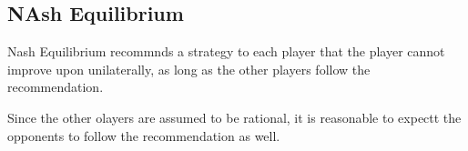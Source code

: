 
\subsection{NAsh Equilibrium}

Nash Equilibrium recommnds a strategy to each player that the player cannot improve upon unilaterally, as long as the other players follow the recommendation.

Since the other olayers are assumed to be rational, it is reasonable to expectt the opponents to follow the recommendation as well.
